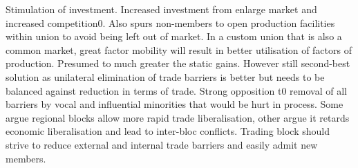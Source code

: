 \documentclass[12pt]{examnotes}
\begin{document}
\ra Stimulation of investment. Increased investment from enlarge market and increased competition0. Also spurs non-members to open production facilities within union to avoid being left out of market.
\ra In a custom union that is also a common market, great factor mobility will result in better utilisation of factors of production.
\ra Presumed to much greater the static gains. However still second-best solution as unilateral elimination of trade barriers is better but needs to be balanced against reduction in terms of trade.
\ra Strong opposition t0 removal of all barriers by vocal and influential minorities that would be hurt in process.
\ra Some argue regional blocks allow more rapid trade liberalisation, other argue it retards economic liberalisation and lead to inter-bloc conflicts. 
\ra Trading block should strive to reduce external and internal trade barriers and easily admit new members.
\end{document}
